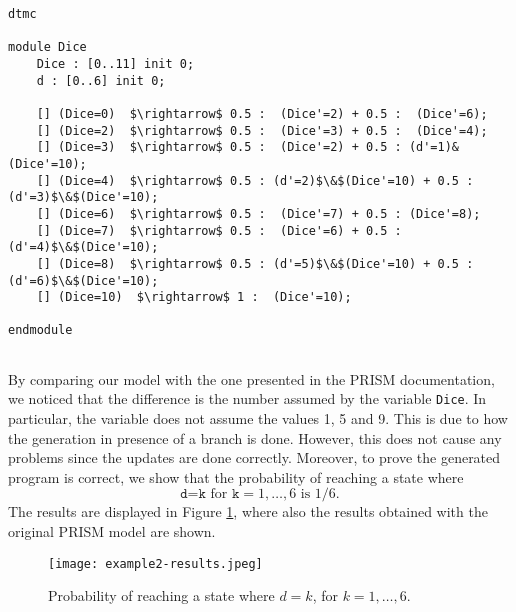\begin{lstlisting}[style=prism-color,caption={Generated PRISM program for the Dice Program.},captionpos=b,label={ex1-gen}]
dtmc

module Dice
	Dice : [0..11] init 0;
	d : [0..6] init 0; 

	[] (Dice=0)  $\rightarrow$ 0.5 :  (Dice'=2) + 0.5 :  (Dice'=6); 
	[] (Dice=2)  $\rightarrow$ 0.5 :  (Dice'=3) + 0.5 :  (Dice'=4); 
	[] (Dice=3)  $\rightarrow$ 0.5 :  (Dice'=2) + 0.5 : (d'=1)&(Dice'=10); 
	[] (Dice=4)  $\rightarrow$ 0.5 : (d'=2)$\&$(Dice'=10) + 0.5 : (d'=3)$\&$(Dice'=10);
	[] (Dice=6)  $\rightarrow$ 0.5 :  (Dice'=7) + 0.5 : (Dice'=8); 
	[] (Dice=7)  $\rightarrow$ 0.5 :  (Dice'=6) + 0.5 : (d'=4)$\&$(Dice'=10);
	[] (Dice=8)  $\rightarrow$ 0.5 : (d'=5)$\&$(Dice'=10) + 0.5 : (d'=6)$\&$(Dice'=10); 
	[] (Dice=10)  $\rightarrow$ 1 :  (Dice'=10);

endmodule
	
\end{lstlisting}

By comparing our model with the one presented in the PRISM documentation, we noticed that the difference is the number assumed by the variable {\tt Dice}. In particular, the variable does not assume the values 1, 5 and 9. This is due to how the generation in presence of a branch is done. However, this does not cause any problems since the updates are done correctly.
Moreover,  to prove the generated program is correct, we show that the probability of reaching a state where 
$$\texttt{d=k} \text{ for } \texttt{k}=1,\ldots,6 \text{ is } 1/6.$$
The results are displayed in Figure \ref{ex1-res}, where also the results obtained with the original PRISM model are shown.
\begin{figure}[h]
\centering
\texttt{[image: example2-results.jpeg]}	
\caption{Probability of reaching a state where $d=k$, for $k=1,\ldots,6.$}
\label{ex1-res}
\end{figure}

